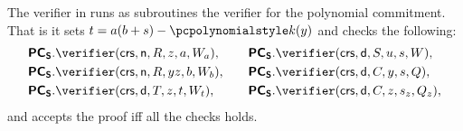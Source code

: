 \let\accentvec\vec \documentclass[runningheads]{llncs}
\begin{document}
	The verifier in \sonic{} runs as subroutines the verifier for the polynomial
	commitment. That is it sets $t = a(b + s) - \p{k}(y)$ and checks the following:
	\begin{equation*}
		\begin{split}
		&\PCOMs.\verifier(\crs, \multconstr, R, z, a, W_a), \\
		&\PCOMs.\verifier(\crs, \multconstr, R, yz, b, W_b),\\
		&\PCOMs.\verifier(\crs, \dconst, T, z, t, W_t),\\	
		\end{split}
		\qquad
		\begin{split}
		&\PCOMs.\verifier(\crs, \dconst, S, u, s, W),\\
		&\PCOMs.\verifier(\crs, \dconst, C, y, s, Q),\\
		&\PCOMs.\verifier(\crs, \dconst, C, z, s_z, Q_z),
		\end{split}
	\end{equation*}
	and accepts the proof iff all the checks holds.
	

	
\end{document}
